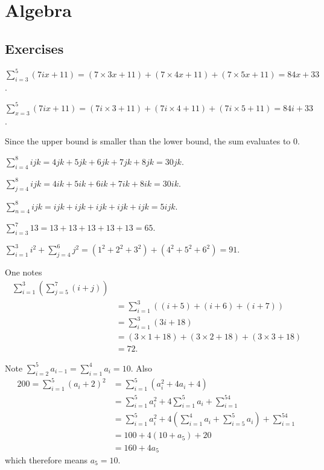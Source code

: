 \section{Algebra}
\subsection*{Exercises}
\begin{questions}
    \item \begin{partquestions}{\alph*}
        \item $\displaystyle \sum_{i=3}^{5}(7ix+11) = (7\times3x + 11) + (7\times4x + 11) + (7\times5x + 11) = 84x + 33$.
        \item $\displaystyle \sum_{x=3}^{5}(7ix+11) = (7i\times3 + 11) + (7i\times4 + 11) + (7i\times5 + 11) = 84i + 33$.
        \item Since the upper bound is smaller than the lower bound, the sum evaluates to 0.
        \item $\displaystyle \sum_{i=4}^{8}ijk = 4jk + 5jk + 6jk + 7jk + 8jk = 30jk$.
        \item $\displaystyle \sum_{j=4}^{8}ijk = 4ik + 5ik + 6ik + 7ik + 8ik = 30ik$.
        \item $\displaystyle \sum_{n=4}^{8}ijk = ijk + ijk + ijk + ijk + ijk = 5ijk$.
        \item $\displaystyle \sum_{i=3}^{7}13 = 13 + 13 + 13 + 13 + 13 = 65$.
        \item $\displaystyle \sum_{i=1}^{3}i^2 + \sum_{j=4}^{6}j^2 = (1^2 + 2^2 + 3^2) + (4^2 + 5^2 + 6^2) = 91$.
        \item One notes
        \begin{align*}
            \sum_{i=1}^{3}\left(\sum_{j=5}^{7}(i+j)\right)\\
            &= \sum_{i=1}^{3}\left((i+5) + (i+6) + (i+7)\right)\\
            &= \sum_{i=1}^{3}\left(3i+18\right)\\
            &= (3\times1 + 18) + (3\times2 + 18) + (3\times3 + 18)\\
            &= 72.
        \end{align*}
    \end{partquestions}

    \item Note $\displaystyle \sum_{i=2}^5a_{i-1} = \sum_{i=1}^4a_i = 10$. Also
    \begin{align*}
        200 = \sum_{i=1}^5(a_i+2)^2 &= \sum_{i=1}^5(a_i^2 + 4a_i + 4)\\
        &= \sum_{i=1}^5a_i^2 + 4\sum_{i=1}^5a_i + \sum_{i=1}^54\\
        &= \sum_{i=1}^5a_i^2 + 4\left(\sum_{i=1}^4a_i + \sum_{i=5}^5a_i\right) + \sum_{i=1}^54\\
        &= 100 + 4\left(10 + a_5\right) + 20\\
        &= 160 + 4a_5
    \end{align*}
    which therefore means $a_5 = 10$.


\end{questions}
